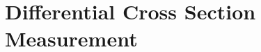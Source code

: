 \chapter{Differential Cross Section Measurement}
\ifpdf
    \graphicspath{{04_Service_work/plots/}}
\else
    \graphicspath{{04_Service_work/plots/EPS/}{04_Service_work/plots/}}
\fi



